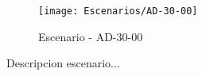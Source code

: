 \begin{figure}[H]
\centering
\texttt{[image: Escenarios/AD-30-00]}
\caption{Escenario - AD-30-00}
\label{fig:AD-30-00}
\end{figure}

Descripcion escenario...
\clearpage
